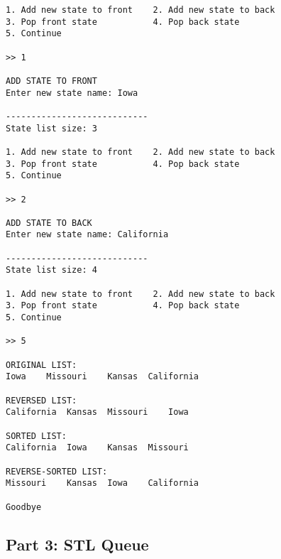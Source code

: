 \begin{lstlisting}[style=output]
1. Add new state to front	 2. Add new state to back
3. Pop front state		     4. Pop back state
5. Continue

>> 1

ADD STATE TO FRONT
Enter new state name: Iowa

----------------------------
State list size: 3

1. Add new state to front	 2. Add new state to back
3. Pop front state		     4. Pop back state
5. Continue

>> 2

ADD STATE TO BACK
Enter new state name: California

----------------------------
State list size: 4

1. Add new state to front	 2. Add new state to back
3. Pop front state		     4. Pop back state
5. Continue

>> 5

ORIGINAL LIST:
Iowa	Missouri	Kansas	California	

REVERSED LIST:
California	Kansas	Missouri	Iowa	

SORTED LIST:
California	Iowa	Kansas	Missouri	

REVERSE-SORTED LIST:
Missouri	Kansas	Iowa	California	

Goodbye
\end{lstlisting}

    \newpage
    \subsection{Part 3: STL Queue}

